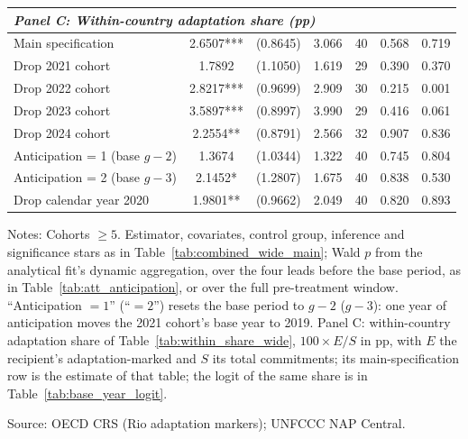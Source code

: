 \begin{table}[H]
{\begin{tabular}{lcccccc}
\multicolumn{7}{l}{\textit{Panel C: Within-country adaptation share (pp)}} \\
\midrule
Main specification & 2.6507*** & (0.8645) & 3.066 & 40 & 0.568 & 0.719 \\
Drop 2021 cohort & 1.7892 & (1.1050) & 1.619 & 29 & 0.390 & 0.370 \\
Drop 2022 cohort & 2.8217*** & (0.9699) & 2.909 & 30 & 0.215 & 0.001 \\
Drop 2023 cohort & 3.5897*** & (0.8997) & 3.990 & 29 & 0.416 & 0.061 \\
Drop 2024 cohort & 2.2554** & (0.8791) & 2.566 & 32 & 0.907 & 0.836 \\
Anticipation = 1 (base $g-2$) & 1.3674 & (1.0344) & 1.322 & 40 & 0.745 & 0.804 \\
Anticipation = 2 (base $g-3$) & 2.1452* & (1.2807) & 1.675 & 40 & 0.838 & 0.530 \\
Drop calendar year 2020 & 1.9801** & (0.9662) & 2.049 & 40 & 0.820 & 0.893 \\
\bottomrule
\end{tabular}
}
\par\vspace{4pt}
\begin{minipage}{\linewidth}\footnotesize
Notes: Cohorts $\geq 5$. Estimator, covariates, control group, inference and significance stars as in Table~\ref{tab:combined_wide_main}; Wald $p$ from the analytical fit's dynamic aggregation, over the four leads before the base period, as in Table~\ref{tab:att_anticipation}, or over the full pre-treatment window. ``Anticipation $=1$'' (``$=2$'') resets the base period to $g-2$ ($g-3$): one year of anticipation moves the 2021 cohort's base year to 2019. Panel C: within-country adaptation share of Table~\ref{tab:within_share_wide}, $100 \times E/S$ in pp, with $E$ the recipient's adaptation-marked and $S$ its total commitments; its main-specification row is the estimate of that table; the logit of the same share is in Table~\ref{tab:base_year_logit}.\par
Source: OECD CRS (Rio adaptation markers); UNFCCC NAP Central.
\end{minipage}
\end{table}
